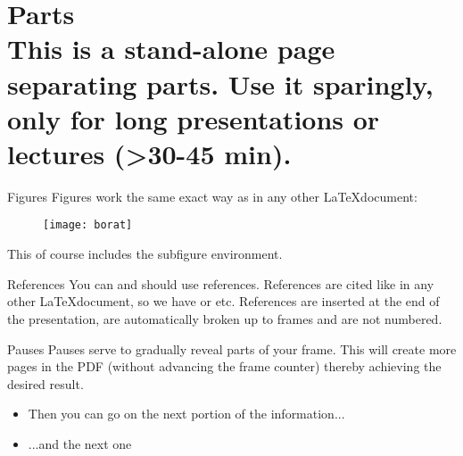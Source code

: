 \documentclass{beamer}
\begin{document}
\part{{\bf Parts} \protect\\ This is a stand-alone page separating parts. Use it sparingly, only for long presentations or lectures (>30-45 min).}
\frame{\partpage}

\begin{frame}{Figures}
Figures work the same exact way as in any other \LaTeX document:
\begin{figure}
\centering
  \texttt{[image: borat]}\\
\end{figure}
This of course includes the subfigure environment.
\end{frame}

\begin{frame}{References}
You can and should use references. References are cited like in any other \LaTeX document, so we have \cite{Takacs2016b} or \cite{Asato2015,Stark2013} etc. References are inserted at the end of the presentation, are automatically broken up to frames and are not numbered.
\end{frame}

\begin{frame}{Pauses}
Pauses serve to gradually reveal parts of your frame. This will create more pages in the PDF (without advancing the frame counter) thereby achieving the desired result.
\pause
\begin{itemize}
\item Then you can go on the next portion of the information...
\pause
\item ...and the next one
\end{itemize}
\end{frame}
\end{document}

